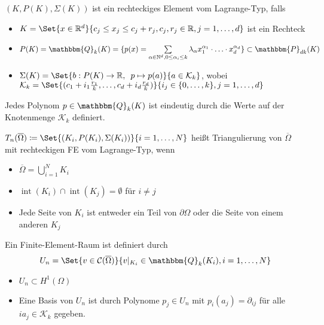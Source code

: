 \documentclass{cheat-sheet}
\newcommand{\Cont}{\mathcal{C}} %
\newcommand{\clos}[1]{\overline{#1}} %
\newcommand{\cOmega}{\clos{\Omega}} %
\newcommand{\bOmega}{\partial \Omega} %
\DeclareMathOperator{\inte}{int} %
\newcommand{\Poly}{\mathbbm{P}} %
\newcommand{\Qoly}{\mathbbm{Q}} %
\begin{document}


\begin{defn}
  $(K, P(K), \Sigma(K))$ ist ein rechteckiges Element vom Lagrange-Typ, falls
  \begin{itemize}
    \item $K = \Set{x \in \R^d}{c_j \leq x_j \leq c_j + r_j, c_j, r_j \in \R, j = 1, \ldots, d}$ ist ein Rechteck
    \item $P(K) = \Qoly_k(K) = \{ p(x) = \sum_{\alpha \in \N^d, 0 \leq \alpha_i \leq k} \lambda_\alpha x_1^{\alpha_1} \cdot \ldots \cdot x_d^{\alpha_d} \} \subset \Poly_{dk}(K)$
    \item $\Sigma(K) = \Set{b : P(K) \to \R, \enspace p \mapsto p(a)}{a \in \mathcal{K}_k}$, wobei $\mathcal{K}_k = \Set{(c_1 + i_1 \tfrac{r_1}{k}, \ldots, c_d + i_d \tfrac{r_d}{k})}{i_j \in \{ 0, \ldots, k \}, j = 1, \ldots, d}$
  \end{itemize}
\end{defn}


\begin{satz}
  Jedes Polynom $p \in \Qoly_k(K)$ ist eindeutig durch die Werte auf der Knotenmenge $\mathcal{K}_k$ definiert.
\end{satz}

\begin{defn}
  $T_n(\cOmega) \coloneqq \Set{(K_i, P(K_i), \Sigma(K_i))}{i = 1, \ldots, N}$ heißt Triangulierung von $\cOmega$ mit rechteckigen FE vom Lagrange-Typ, wenn
  \begin{itemize}
    \item $\cOmega = \bigcup_{i=1}^N K_i$
    \item $\inte(K_i) \cap \inte(K_j) = \emptyset$ für $i \neq j$
    \item Jede Seite von $K_i$ ist entweder ein Teil von $\bOmega$ oder die Seite von einem anderen $K_j$
  \end{itemize}
\end{defn}

\begin{defn}
  Ein Finite-Element-Raum ist definiert durch
  \[
    U_n = \Set{v \in \Cont(\cOmega)}{v|_{K_i} \in \Qoly_k(K_i), i = 1, \ldots, N}
  \]
\end{defn}

\begin{satz}
  \begin{itemize}
    \item $U_n \subset H^1(\Omega)$
    \item Eine Basis von $U_n$ ist durch Polynome $p_j \in U_n$ mit $p_i(a_j) = \partial_{ij}$ für alle $ia_j \in \mathcal{K}_k$ gegeben.
  \end{itemize}
\end{satz}
\end{document}
